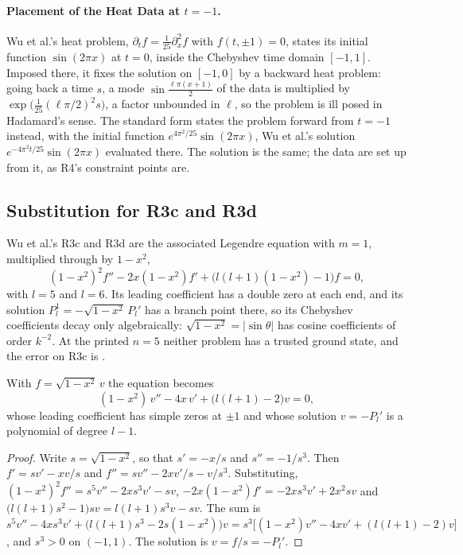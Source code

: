 \paragraph{Placement of the Heat Data at $t=-1$.} Wu et al.'s heat problem, $\partial_tf=\tfrac1{25}\partial_x^2f$ with $f(t,\pm1)=0$, states its initial function $\sin(2\pi x)$ at $t=0$, inside the Chebyshev time domain $[-1,1]$. Imposed there, it fixes the solution on $[-1,0]$ by a backward heat problem: going back a time $s$, a mode $\sin\tfrac{\ell\pi(x+1)}{2}$ of the data is multiplied by $\exp\bigl(\tfrac{1}{25}(\ell\pi/2)^2s\bigr)$, a factor unbounded in $\ell$, so the problem is ill posed in Hadamard's sense. The standard form states the problem forward from $t=-1$ instead, with the initial function $e^{4\pi^2/25}\sin(2\pi x)$, Wu et al.'s solution $e^{-4\pi^2t/25}\sin(2\pi x)$ evaluated there. The solution is the same; the data are set up from it, as R4's constraint points are.

\subsection{Substitution for R3c and R3d}
\label{app:legendre-substitution}

Wu et al.'s R3c and R3d are the associated Legendre equation with $m=1$, multiplied through by $1-x^2$,
\begin{equation*}
    (1-x^2)^2f''-2x(1-x^2)f'+\bigl(l(l+1)(1-x^2)-1\bigr)f=0,
\end{equation*}
with $l=5$ and $l=6$. Its leading coefficient has a double zero at each end, and its solution $P_l^1=-\sqrt{1-x^2}\,P_l'$ has a branch point there, so its Chebyshev coefficients decay only algebraically: $\sqrt{1-x^2}=|\sin\theta|$ has cosine coefficients of order $k^{-2}$. At the printed $n=5$ neither problem has a trusted ground state, and the error on R3c is .

\begin{proposition}
\label{prop:legendre-substitution}
With $f=\sqrt{1-x^2}\,v$ the equation becomes
\begin{equation}
    (1-x^2)\,v''-4x\,v'+\bigl(l(l+1)-2\bigr)v=0,
    \label{eq:app-legendre-v}
\end{equation}
whose leading coefficient has simple zeros at $\pm1$ and whose solution $v=-P_l'$ is a polynomial of degree $l-1$.
\end{proposition}
\begin{proof}
Write $s=\sqrt{1-x^2}$, so that $s'=-x/s$ and $s''=-1/s^3$. Then $f'=sv'-xv/s$ and $f''=sv''-2xv'/s-v/s^3$. Substituting, $(1-x^2)^2f''=s^5v''-2xs^3v'-sv$, $-2x(1-x^2)f'=-2xs^3v'+2x^2sv$ and $\bigl(l(l+1)s^2-1\bigr)sv=l(l+1)s^3v-sv$. The sum is $s^5v''-4xs^3v'+\bigl(l(l+1)s^3-2s(1-x^2)\bigr)v=s^3\bigl[(1-x^2)v''-4xv'+(l(l+1)-2)v\bigr]$, and $s^3>0$ on $(-1,1)$. The solution is $v=f/s=-P_l'$.
\end{proof}


